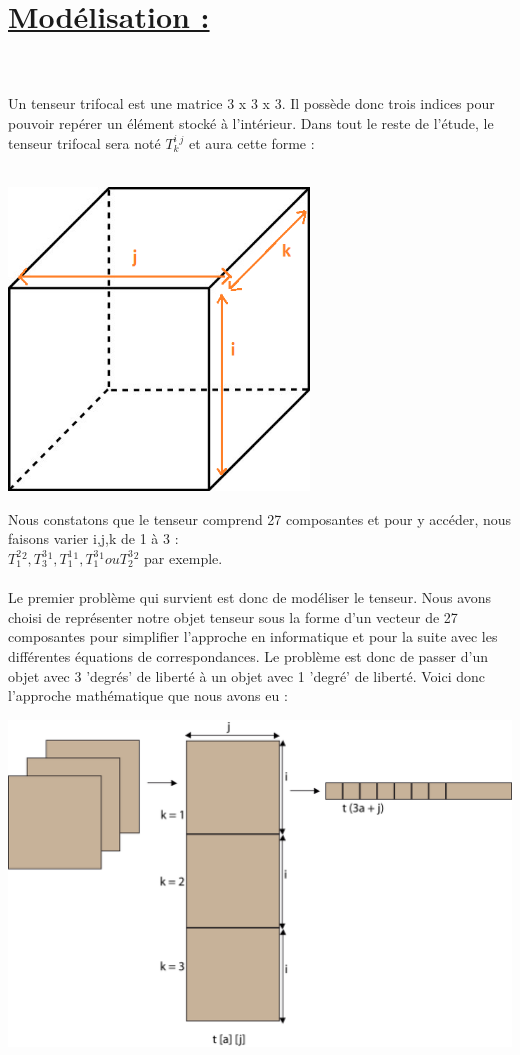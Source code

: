 \documentclass[a4paper,11pt,fleqn]{report}
\begin{document}
	\section{\underline{Mod\'elisation :}}
	\\\\
	Un tenseur trifocal est une matrice 3 x 3 x 3. Il poss\`ede donc trois indices pour pouvoir rep\'erer un \'el\'ement stock\'e \`a l'int\'erieur. Dans tout le reste de l'\'etude, le tenseur trifocal sera not\'e $T_k^i^j$ et aura cette forme :\\\\
	\begin{center}\includegraphics[width=0.60\textwidth]{./tenseur.png}\end{center}
	Nous constatons que le tenseur comprend 27 composantes et pour y acc\'eder, nous faisons varier i,j,k de 1 \`a 3 : \\ $T_1^2^2 , T_3^3^1 , T_1^1^1 , T_1^3^1 ou T_2^3^2 $ par exemple.\\\\Le premier probl\`eme qui survient est donc de mod\'eliser le tenseur. Nous avons choisi de repr\'esenter notre objet tenseur sous la forme d'un vecteur de 27 composantes pour simplifier l'approche en informatique et pour la suite avec les diff\'erentes \'equations de correspondances. Le probl\`eme est donc de passer d'un objet avec 3 'degr\'es' de libert\'e \`a un objet avec 1 'degr\'e' de libert\'e. Voici donc l'approche math\'ematique que nous avons eu :
	\\
	\begin{center}\includegraphics[width=1.2\textwidth]{./schema1.png}\end{center}
\end{document}

